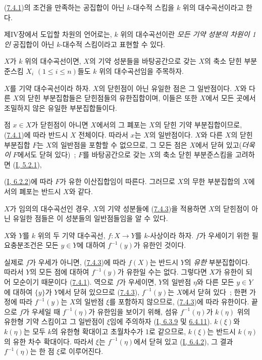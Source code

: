 \begin{definition}[7.4.2]
\label{II.7.4.2-ko}
(\hyperref[II.7.4.1-ko]{7.4.1})의 조건을 만족하는 공집합이 아닌
$k$-대수적 스킴을 $k$ 위의 대수곡선이라고 한다.
\end{definition}

제IV장에서 도입할 차원의 언어로는, $k$ 위의 대수곡선이란
\emph{모든 기약 성분의 차원이 1인} 공집합이 아닌 $k$-대수적 스킴이라고
표현할 수 있다.

$X$가 $k$ 위의 대수곡선이면, $X$의 기약 성분들을 바탕공간으로 갖는
$X$의 축소 닫힌 부분준스킴 $X_i$ $(1\leq i\leq n)$들도 $k$ 위의
대수곡선임을 주목하자.

\begin{corollary}[7.4.3]
\label{II.7.4.3-ko}
$X$를 기약 대수곡선이라 하자. $X$의 닫힌점이 아닌 유일한 점은 그
일반점이다. $X$와 다른 $X$의 닫힌 부분집합들은 닫힌점들의 유한집합이며,
이들은 또한 $X$에서 모든 곳에서 조밀하지 않은 유일한 부분집합들이다.
\end{corollary}

점 $x\in X$가 닫힌점이 아니면 $X$에서의 그 폐포는 $X$의 닫힌 기약
부분집합이므로, (\hyperref[II.7.4.1-ko]{7.4.1})에 따라 반드시 $X$
전체이다. 따라서 $x$는 $X$의 일반점이다. $X$와 다른 $X$의 닫힌
부분집합 $F$는 $X$의 일반점을 포함할 수 없으므로, 그 모든 점은
$X$에서 닫혀 있고(\emph{더욱이} $F$에서도 닫혀 있다)~; $F$를
바탕공간으로 갖는 $X$의 축소 닫힌 부분준스킴을 고려하면
(\hyperref[I.5.2.1-ko]{I, 5.2.1}),


(\hyperref[I.6.2.2-ko]{I, 6.2.2})에 따라 $F$가 유한 이산집합임이
따른다. 그러므로 $X$의 무한 부분집합의 $X$에서의 폐포는 반드시
$X$와 같다.

$X$가 임의의 대수곡선인 경우, $X$의 기약 성분들에
(\hyperref[II.7.4.3-ko]{7.4.3})을 적용하면 $X$의 닫힌점이 아닌 유일한
점들은 이 성분들의 일반점들임을 알 수 있다.

\begin{corollary}[7.4.4]
\label{II.7.4.4-ko}
$X$와 $Y$를 $k$ 위의 두 기약 대수곡선, $f:X\to Y$를
$k$-사상이라 하자. $f$가 우세이기 위한 필요충분조건은 모든 $y\in Y$에
대하여 $f^{-1}(y)$가 유한인 것이다.
\end{corollary}

실제로 $f$가 우세가 아니면, (\hyperref[II.7.4.3-ko]{7.4.3})에 따라
$f(X)$는 반드시 $Y$의 \emph{유한} 부분집합이다. 따라서 $Y$의 모든 점에
대하여 $f^{-1}(y)$가 유한일 수는 없다. 그렇다면 $X$가 유한이 되어
모순이기 때문이다 (\hyperref[II.7.4.1-ko]{7.4.1}). 역으로 $f$가 우세이면,
$Y$의 일반점 $\eta$와 다른 모든 $y\in Y$에 대하여 $\{y\}$가 $Y$에서
닫혀 있으므로 (\hyperref[II.7.4.3-ko]{7.4.3}), $f^{-1}(y)$는 $X$에서
닫혀 있다~; 한편 가정에 따라 $f^{-1}(y)$는 $X$의 일반점 $\xi$를
포함하지 않으므로, (\hyperref[II.7.4.3-ko]{7.4.3})에 따라 유한이다.
끝으로 $f$가 우세일 때 $f^{-1}(\eta)$가 유한임을 보이기 위해, 섬유
$f^{-1}(\eta)$가 $k(\eta)$ 위의 유한형 기약 스킴이고 그 일반점이
$\xi$임에 주의하자 (\hyperref[I.6.3.9-ko]{I, 6.3.9} 및
\hyperref[I.6.4.11-ko]{6.4.11}). $k(\xi)$와 $k(\eta)$는 모두 $k$의
유한형 확대이고 초월차수가 1로 같으므로, $k(\xi)$는 반드시
$k(\eta)$의 유한 차수 확대이다. 따라서 $\xi$는 $f^{-1}(\eta)$에서
닫혀 있고 (\hyperref[I.6.4.2-ko]{I, 6.4.2}), 그 결과
$f^{-1}(\eta)$는 한 점 $\xi$로 이루어진다.

